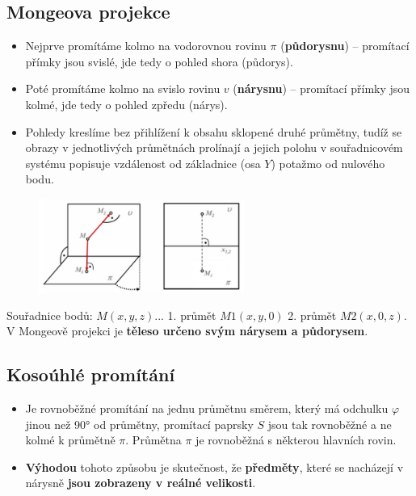 \subsection{Mongeova projekce}
\begin{itemize}
	\item Nejprve promítáme kolmo na vodorovnou rovinu $\pi$ (\textbf{půdorysnu}) -- promítací přímky jsou svislé, jde tedy o pohled shora (půdorys).
	\item Poté promítáme kolmo na svislo rovinu $v$ (\textbf{nárysnu}) -- promítací přímky jsou kolmé, jde tedy o pohled zpředu (nárys).
	\item Pohledy kreslíme bez přihlížení k obsahu sklopené druhé průmětny, tudíž se obrazy v jednotlivých průmětnách prolínají a jejich polohu v souřadnicovém systému popisuje vzdálenost od základnice (osa $Y$) potažmo od nulového bodu.
\end{itemize}
\begin{figure}[H]
\centering
\includegraphics[width=0.6\textwidth]{assets/2_mongeova}
\end{figure}

Souřadnice bodů: $M(x, y, z)$... 1. průmět $M1 (x, y, 0)$ 2. průmět $M2 (x, 0, z)$. V Mongeově projekci je\textbf{ těleso určeno svým nárysem a půdorysem}.
\subsection{Kosoúhlé promítání}
\begin{itemize}
	\item Je rovnoběžné promítání na jednu průmětnu směrem, který má odchulku $\varphi$ jinou než \ang{90} od průmětny, promítací paprsky $S$ jsou tak rovnoběžné a ne kolmé k průmětně $\pi$. Průmětna $\pi$ je rovnoběžná s některou hlavních rovin.
	\item \textbf{Výhodou} tohoto způsobu je skutečnost, že \textbf{předměty}, které se nacházejí v nárysně \textbf{jsou zobrazeny v reálné velikosti}.
\end{itemize}

